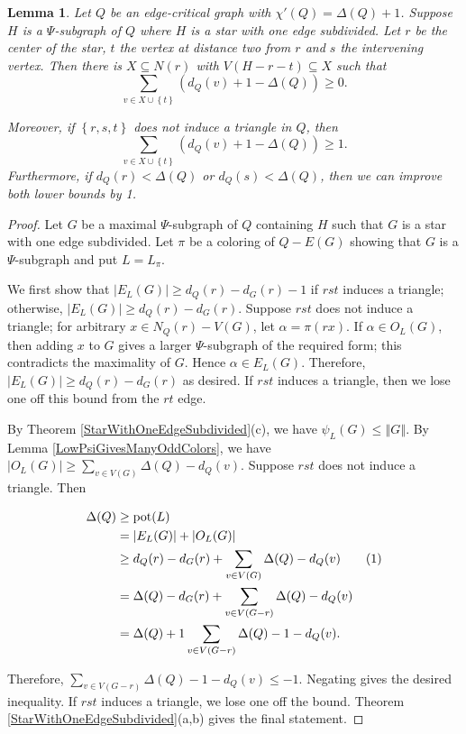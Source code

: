 \documentclass[12pt]{article}
\theoremstyle{plain}
\newtheorem{lem}[thm]{Lemma}
\theoremstyle{definition}
\theoremstyle{remark}
\newcommand{\set}[1]{\left\{ #1 \right\}}
\newcommand{\card}[1]{\left|#1\right|}
\newcommand{\size}[1]{\left\Vert#1\right\Vert}
\newcommand{\pot}{\operatorname{pot}}
\newcommand\numberthis{\addtocounter{equation}{1}\tag{\theequation}}
\begin{document}
\begin{lem}\label{AdjacencyPrecursor}
	Let $Q$ be an edge-critical graph with $\chi'(Q) = \Delta(Q) + 1$.  Suppose $H$ is a $\Psi$-subgraph of $Q$ where $H$ is a star with one edge subdivided.  Let $r$ be the center of the star, $t$ the vertex at distance two from $r$ and $s$ the intervening vertex. Then there is $X \subseteq N(r)$ with $V(H - r - t) \subseteq X$ such that 
	\[\sum_{v \in X \cup \set{t}} (d_Q(v) + 1 - \Delta(Q)) \ge 0.\]  
	
	\noindent Moreover, if $\set{r,s,t}$ does not induce a triangle in $Q$, then 
	\[\sum_{v \in X \cup \set{t}} (d_Q(v) + 1 - \Delta(Q)) \ge 1.\]
	Furthermore, if $d_Q(r)<\Delta(Q)$ or $d_Q(s)<\Delta(Q)$, then we can improve both lower bounds by 1.
\end{lem}
\begin{proof}
	Let $G$ be a maximal $\Psi$-subgraph of $Q$ containing $H$ such that $G$ is a star with one edge subdivided.  Let $\pi$ be a coloring of $Q - E(G)$ showing that $G$ is a $\Psi$-subgraph and put $L = L_\pi$.  
	
	We first show that $\card{E_{L}(G)} \ge d_Q(r) - d_G(r) - 1$ if $rst$ induces a triangle; otherwise, $\card{E_{L}(G)} \ge d_Q(r) - d_G(r)$.
	Suppose $rst$ does not induce a triangle; for arbitrary $x \in N_Q(r) - V(G)$,
	let $\alpha=\pi(rx)$.  If $\alpha \in O_{L}(G)$, then adding $x$ to $G$ gives a
	larger $\Psi$-subgraph of the required form; this contradicts the maximality of
	$G$.  Hence $\alpha \in E_{L}(G)$.  Therefore, $\card{E_{L}(G)} \ge d_Q(r) -
	d_G(r)$ as desired.  If $rst$ induces a triangle, then we lose one off this
	bound from the $rt$ edge.
	
	By Theorem \ref{StarWithOneEdgeSubdivided}(c), we have $\psi_L(G) \le
	\size{G}$.  By Lemma \ref{LowPsiGivesManyOddColors}, we have
	$\card{O_{L}(G)} \ge \sum_{v \in V(G)} \Delta(Q) - d_Q(v)$.  Suppose $rst$ does not induce a triangle. Then
	
	\begin{align*}
	\Delta(Q) &\ge \pot(L)\\
	&= \card{E_{L}(G)} + \card{O_{L}(G)}\\
	&\ge d_Q(r) - d_G(r) + \sum_{v \in V(G)} \Delta(Q) - d_Q(v) \numberthis
	\label{strict-ineq}\\
	&= \Delta(Q) - d_G(r) + \sum_{v \in V(G - r)} \Delta(Q) - d_Q(v)\\
	&= \Delta(Q) + 1 \sum_{v \in V(G - r)} \Delta(Q) - 1 - d_Q(v).
	\end{align*}
	
	Therefore, $\sum_{v \in V(G - r)} \Delta(Q) - 1 - d_Q(v) \le -1$.  Negating gives the desired inequality.  If $rst$ induces a triangle, we lose one off the bound.  Theorem \ref{StarWithOneEdgeSubdivided}(a,b) gives the final statement.
\end{proof}



\end{document}

